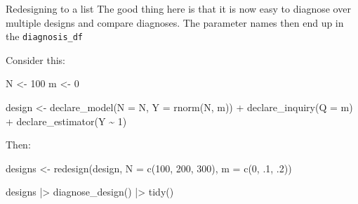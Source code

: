\documentclass[
  11pt,
  ignorenonframetext,
]{beamer}
\newenvironment{Shaded}{\begin{snugshade}}{\end{snugshade}}
\newcommand{\AttributeTok}[1]{\textcolor[rgb]{0.40,0.45,0.13}{#1}}
\newcommand{\DecValTok}[1]{\textcolor[rgb]{0.68,0.00,0.00}{#1}}
\newcommand{\FunctionTok}[1]{\textcolor[rgb]{0.28,0.35,0.67}{#1}}
\newcommand{\NormalTok}[1]{\textcolor[rgb]{0.00,0.23,0.31}{#1}}
\newcommand{\OtherTok}[1]{\textcolor[rgb]{0.00,0.23,0.31}{#1}}
\newcommand{\SpecialCharTok}[1]{\textcolor[rgb]{0.37,0.37,0.37}{#1}}
\begin{document}
\begin{frame}[fragile]{Redesigning to a list}
\protect\hypertarget{redesigning-to-a-list-1}{}
The good thing here is that it is now easy to diagnose over multiple
designs and compare diagnoses. The parameter names then end up in the
\texttt{diagnosis\_df}

Consider this:

\begin{Shaded}
\begin{Highlighting}[]
\NormalTok{N }\OtherTok{\textless{}{-}} \DecValTok{100}
\NormalTok{m }\OtherTok{\textless{}{-}} \DecValTok{0}

\NormalTok{design }\OtherTok{\textless{}{-}} 
  \FunctionTok{declare\_model}\NormalTok{(}\AttributeTok{N =}\NormalTok{ N, }\AttributeTok{Y =} \FunctionTok{rnorm}\NormalTok{(N, m)) }\SpecialCharTok{+}
  \FunctionTok{declare\_inquiry}\NormalTok{(}\AttributeTok{Q =}\NormalTok{ m) }\SpecialCharTok{+}
  \FunctionTok{declare\_estimator}\NormalTok{(Y }\SpecialCharTok{\textasciitilde{}} \DecValTok{1}\NormalTok{) }
\end{Highlighting}
\end{Shaded}

Then:

\begin{Shaded}
\begin{Highlighting}[]
\NormalTok{designs }\OtherTok{\textless{}{-}}  \FunctionTok{redesign}\NormalTok{(design, }\AttributeTok{N =} \FunctionTok{c}\NormalTok{(}\DecValTok{100}\NormalTok{, }\DecValTok{200}\NormalTok{, }\DecValTok{300}\NormalTok{), }\AttributeTok{m =} \FunctionTok{c}\NormalTok{(}\DecValTok{0}\NormalTok{, .}\DecValTok{1}\NormalTok{, .}\DecValTok{2}\NormalTok{))}
  
\NormalTok{designs }\SpecialCharTok{|\textgreater{}} \FunctionTok{diagnose\_design}\NormalTok{() }\SpecialCharTok{|\textgreater{}} \FunctionTok{tidy}\NormalTok{() }
\end{Highlighting}
\end{Shaded}
\end{frame}
\end{document}
